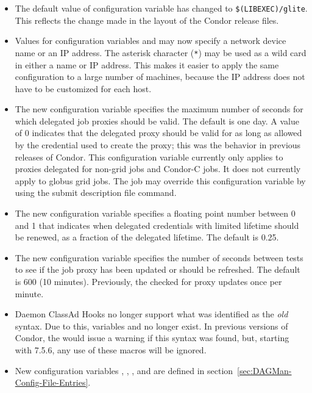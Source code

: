 \begin{itemize}

\item The default value of configuration variable 
  has changed to \verb|$(LIBEXEC)/glite|. This reflects the change made in the
  layout of the Condor release files.

\item Values for configuration variables  and
   may now specify a network
  device name or an IP address.  The asterisk character (\verb|*|)
  may be used as a wild card in either a name or IP address.
  This makes it easier to apply the same
  configuration to a large number of machines, because the IP address
  does not have to be customized for each host.

\item The new configuration variable
   specifies the
  maximum number of seconds for which delegated job proxies should be
  valid.  The default is one day.  A value of 0 indicates that the
  delegated proxy should be valid for as long as allowed by the
  credential used to create the proxy; this was the behavior in
  previous releases of Condor.  This configuration variable currently
  only applies to proxies delegated for non-grid jobs and Condor-C
  jobs.  It does not currently apply to globus grid jobs.  The job may
  override this configuration variable by using the
   submit description file
  command.

\item The new configuration variable
   specifies a
    floating point number between 0 and 1 that indicates when
    delegated credentials with limited lifetime should be renewed, as
    a fraction of the delegated lifetime.  The default is 0.25.

\item The new configuration variable
   specifies the number of
  seconds between tests to see if the job proxy has been updated or
  should be refreshed.  The default is 600 (10 minutes).  Previously,
  the  checked for proxy updates once per minute.

\item Daemon ClassAd Hooks no longer support what was identified as 
  the \emph{old} syntax.  
  Due to this, variables
   and  no longer exist.  
  In previous versions of Condor, the  would issue a
  warning if this syntax was found, but, starting with 7.5.6, any use
  of these macros will be ignored.

\item New configuration variables ,
, ,
and 
are defined in section~\ref{sec:DAGMan-Config-File-Entries}.

\end{itemize}

